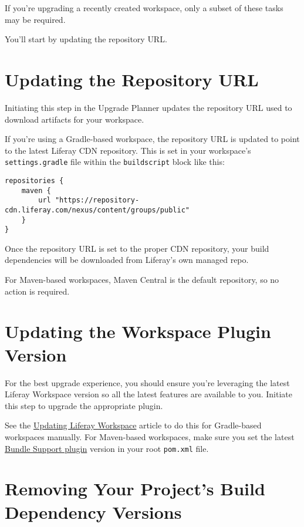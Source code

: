 If you're upgrading a recently created workspace, only a subset of these
tasks may be required.

You'll start by updating the repository URL.

\section{Updating the Repository URL}\label{updating-the-repository-url}

Initiating this step in the Upgrade Planner updates the repository URL
used to download artifacts for your workspace.

If you're using a Gradle-based workspace, the repository URL is updated
to point to the latest Liferay CDN repository. This is set in your
workspace's \texttt{settings.gradle} file within the
\texttt{buildscript} block like this:

\begin{verbatim}
repositories {
    maven {
        url "https://repository-cdn.liferay.com/nexus/content/groups/public"
    }
}
\end{verbatim}

Once the repository URL is set to the proper CDN repository, your build
dependencies will be downloaded from Liferay's own managed repo.

For Maven-based workspaces, Maven Central is the default repository, so
no action is required.

\section{Updating the Workspace Plugin
Version}\label{updating-the-workspace-plugin-version}

For the best upgrade experience, you should ensure you're leveraging the
latest Liferay Workspace version so all the latest features are
available to you. Initiate this step to upgrade the appropriate plugin.

See the
\href{/docs/7-2/reference/-/knowledge_base/r/updating-liferay-workspace}{Updating
Liferay Workspace} article to do this for Gradle-based workspaces
manually. For Maven-based workspaces, make sure you set the latest
\href{/docs/7-2/reference/-/knowledge_base/r/bundle-support-plugin}{Bundle
Support plugin} version in your root \texttt{pom.xml} file.

\section{Removing Your Project's Build Dependency
Versions}\label{removing-your-projects-build-dependency-versions}

